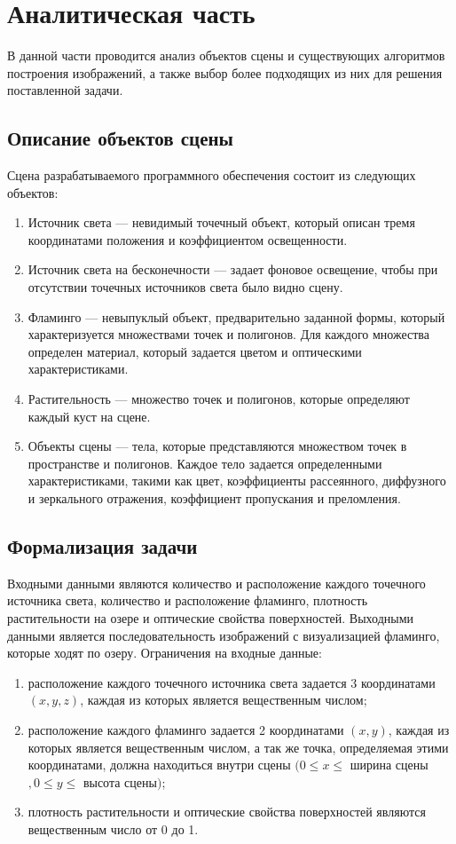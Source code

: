 \chapter{Аналитическая часть}

В данной части проводится анализ объектов сцены и существующих алгоритмов построения изображений, а также выбор более подходящих из них для решения поставленной задачи.

\section{Описание объектов сцены}

Сцена разрабатываемого программного обеспечения состоит из следующих объектов:
\begin{enumerate}[label=\arabic*)]
	\item Источник света --- невидимый точечный объект, который описан тремя координатами положения и коэффициентом освещенности.
	\item Источник света на бесконечности --- задает фоновое освещение, чтобы при отсутствии точечных источников света было видно сцену.
	\item Фламинго --- невыпуклый объект, предварительно заданной формы, который характеризуется множествами точек и полигонов. Для каждого множества определен материал, который задается цветом и оптическими характеристиками.
	\item Растительность --- множество точек и полигонов, которые определяют каждый куст на сцене.
	\item Объекты сцены --- тела, которые представляются множеством точек в пространстве и полигонов. Каждое тело задается определенными характеристиками, такими как цвет, коэффициенты рассеянного, диффузного и зеркального отражения, коэффициент пропускания и преломления.
\end{enumerate} 

\section{Формализация задачи}

Входными данными являются количество и расположение каждого точечного источника света, количество и расположение фламинго, плотность растительности на озере и оптические свойства поверхностей.
Выходными данными является последовательность изображений с визуализацией фламинго, которые ходят по озеру.
Ограничения на входные данные:
\begin{enumerate}[label=\arabic*)]
	\item расположение каждого точечного источника света задается 3 координатами $(x, y, z)$, каждая из которых является вещественным числом;
	\item расположение каждого фламинго задается 2 координатами $(x, y)$, каждая из которых является вещественным числом, а так же точка, определяемая этими координатами, должна находиться внутри сцены $(0 \leq x \leq $ ширина сцены$, 0 \leq y \leq $ высота сцены$)$;
	\item плотность растительности и оптические свойства поверхностей являются вещественным число от 0 до 1.
\end{enumerate} 

